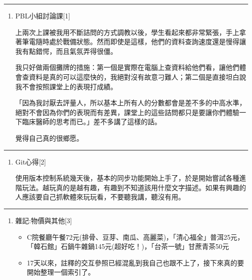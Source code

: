 \documentclass[
]{article}
\providecommand{\tightlist}{%
  \setlength{\itemsep}{0pt}\setlength{\parskip}{0pt}}
\begin{document}
\begin{center}\rule{0.5\linewidth}{\linethickness}\end{center}

\begin{enumerate}
\def\labelenumi{\arabic{enumi}.}
\setcounter{enumi}{1}
\item
  PBL小組討論課{[}1{]}

  上兩次上課被我用不斷詰問的方式調教以後，學生看起來都非常緊張，手上拿著筆電隨時處於戰備狀態。然而即使是這樣，他們的資料查詢速度還是慢得讓我有點錯愕，而且氣氛弄得很僵。

  我只好做兩個攤牌的措施：第一個是實際在電腦上查資料給他們看，讓他們體會查資料是真的可以這麼快的，我絕對沒有故意刁難人；第二個是直接坦白說我不會按照課堂上的表現打成績。

  「因為我討厭去評量人，所以基本上所有人的分數都會是差不多的中高水準，絕對不會因為你們的表現而有差異，課堂上的這些詰問都只是要讓你們體驗一下臨床醫師的思考而已。」差不多講了這樣的話。

  覺得自己真的很鄉愿。
\end{enumerate}

\begin{center}\rule{0.5\linewidth}{\linethickness}\end{center}

\begin{enumerate}
\def\labelenumi{\arabic{enumi}.}
\setcounter{enumi}{2}
\item
  Git心得{[}2{]}

  使用版本控制系統幾天後，基本的同步功能開始上手了，於是開始嘗試各種進階玩法。越玩真的是越有趣，有趣到不知道該用什麼文字描述。如果有興趣的人應該要自己抓軟體來玩玩看，不要聽我講，聽沒有用。
\end{enumerate}

\begin{center}\rule{0.5\linewidth}{\linethickness}\end{center}

\begin{enumerate}
\def\labelenumi{\arabic{enumi}.}
\setcounter{enumi}{3}
\item
  雜記:物價與其他{[}3{]}

  \begin{itemize}
  \tightlist
  \item
    C院餐廳午餐72元(排骨、豆芽、南瓜、高麗菜)，「清心福全」普洱25元，「韓石館」石鍋牛雜鍋145元(超好吃！)，「台茶一號」甘蔗青茶50元
  \item
    17天以來，註釋的交互參照已經混亂到我自己也跟不上了，接下來真的要開始整理一個索引了。
  \end{itemize}
\end{enumerate}
\end{document}
